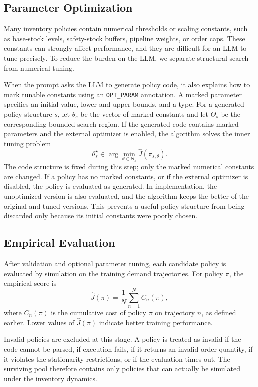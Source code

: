 \documentclass[11pt]{article}
\begin{document}
\subsection{Parameter Optimization}
\label{sec:parameter_optimization}

Many inventory policies contain numerical thresholds or scaling constants, such as base-stock levels, safety-stock buffers, pipeline weights, or order caps. These constants can strongly affect performance, and they are difficult for an LLM to tune precisely. To reduce the burden on the LLM, we separate structural search from numerical tuning.

When the prompt asks the LLM to generate policy code, it also explains how to mark tunable constants using an \texttt{OPT\_PARAM} annotation. A marked parameter specifies an initial value, lower and upper bounds, and a type. For a generated policy structure $s$, let $\theta_s$ be the vector of marked constants and let $\Theta_s$ be the corresponding bounded search region. If the generated code contains marked parameters and the external optimizer is enabled, the algorithm solves the inner tuning problem
\[
\theta_s^\star \in \arg\min_{\theta\in\Theta_s}\hat J(\pi_{s,\theta}).
\]
The code structure is fixed during this step; only the marked numerical constants are changed. If a policy has no marked constants, or if the external optimizer is disabled, the policy is evaluated as generated. In implementation, the unoptimized version is also evaluated, and the algorithm keeps the better of the original and tuned versions. This prevents a useful policy structure from being discarded only because its initial constants were poorly chosen.

\subsection{Empirical Evaluation}
\label{sec:evaluation}

After validation and optional parameter tuning, each candidate policy is evaluated by simulation on the training demand trajectories. For policy $\pi$, the empirical score is
\[
\hat J(\pi)=\frac{1}{N}\sum_{n=1}^{N}C_n(\pi),
\]
where $C_n(\pi)$ is the cumulative cost of policy $\pi$ on trajectory $n$, as defined earlier. Lower values of $\hat J(\pi)$ indicate better training performance.

Invalid policies are excluded at this stage. A policy is treated as invalid if the code cannot be parsed, if execution fails, if it returns an invalid order quantity, if it violates the stationarity restrictions, or if the evaluation times out. The surviving pool therefore contains only policies that can actually be simulated under the inventory dynamics.
\end{document}
